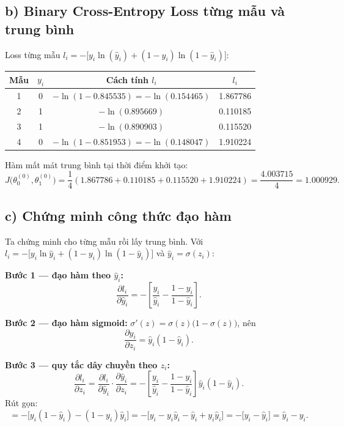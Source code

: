 \documentclass[a4paper,12pt]{article}
\begin{document}
\subsection*{b) Binary Cross-Entropy Loss từng mẫu và trung bình}

Loss từng mẫu $l_i = -\bigl[y_i\ln(\hat{y}_i) + (1-y_i)\ln(1-\hat{y}_i)\bigr]$:

\begin{center}
\begin{tabular}{|c|c|c|c|}
\hline
Mẫu & $y_i$ & Cách tính $l_i$ & $l_i$ \\
\hline
1 & 0 & $-\ln(1-0.845535) = -\ln(0.154465)$ & 1.867786 \\
2 & 1 & $-\ln(0.895669)$ & 0.110185 \\
3 & 1 & $-\ln(0.890903)$ & 0.115520 \\
4 & 0 & $-\ln(1-0.851953) = -\ln(0.148047)$ & 1.910224 \\
\hline
\end{tabular}
\end{center}

Hàm mất mát trung bình tại thời điểm khởi tạo:
\[ J\bigl(\theta_0^{(0)},\theta_1^{(0)}\bigr) = \frac{1}{4}(1.867786+0.110185+0.115520+1.910224)
= \frac{4.003715}{4} = 1.000929. \]

\subsection*{c) Chứng minh công thức đạo hàm}

Ta chứng minh cho từng mẫu rồi lấy trung bình. Với
$l_i = -\bigl[y_i\ln\hat{y}_i + (1-y_i)\ln(1-\hat{y}_i)\bigr]$ và $\hat{y}_i = \sigma(z_i)$:

\textbf{Bước 1 — đạo hàm theo $\hat{y}_i$:}
\[ \frac{\partial l_i}{\partial \hat{y}_i}
= -\left[\frac{y_i}{\hat{y}_i} - \frac{1-y_i}{1-\hat{y}_i}\right]. \]

\textbf{Bước 2 — đạo hàm sigmoid:} $\sigma'(z) = \sigma(z)\bigl(1-\sigma(z)\bigr)$, nên
\[ \frac{\partial \hat{y}_i}{\partial z_i} = \hat{y}_i(1-\hat{y}_i). \]

\textbf{Bước 3 — quy tắc dây chuyền theo $z_i$:}
\[ \frac{\partial l_i}{\partial z_i}
= \frac{\partial l_i}{\partial \hat{y}_i}\cdot\frac{\partial \hat{y}_i}{\partial z_i}
= -\left[\frac{y_i}{\hat{y}_i} - \frac{1-y_i}{1-\hat{y}_i}\right]\hat{y}_i(1-\hat{y}_i). \]
Rút gọn:
\[ = -\bigl[y_i(1-\hat{y}_i) - (1-y_i)\hat{y}_i\bigr]
= -\bigl[y_i - y_i\hat{y}_i - \hat{y}_i + y_i\hat{y}_i\bigr]
= -\bigl[y_i - \hat{y}_i\bigr] = \hat{y}_i - y_i. \]
\end{document}
